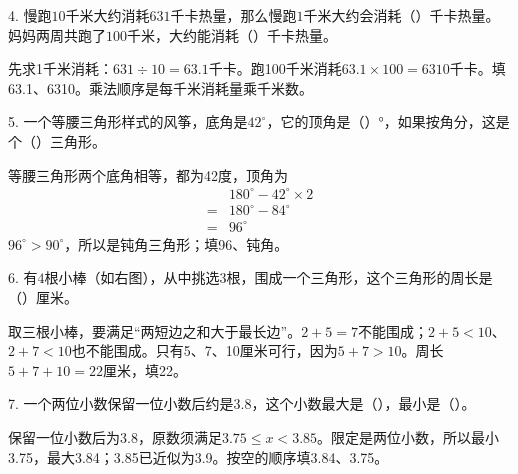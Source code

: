 4. 慢跑\(10\)千米大约消耗\(631\)千卡热量，那么慢跑\(1\)千米大约会消耗（\hspace{1.8em}）千卡热量。妈妈两周共跑了\(100\)千米，大约能消耗（\hspace{1.8em}）千卡热量。\par
\begin{BookAnswer}
先求1千米消耗：\(631\div10=63.1\)千卡。跑100千米消耗\(63.1\times100=6310\)千卡。填63.1、6310。乘法顺序是每千米消耗量乘千米数。
\end{BookAnswer}

5. 一个等腰三角形样式的风筝，底角是\(42^\circ\)，它的顶角是（\hspace{1.8em}）°，如果按角分，这是个（\hspace{1.8em}）三角形。\par
\begin{BookAnswer}
等腰三角形两个底角相等，都为42度，顶角为\[\begin{aligned} &180^\circ-42^\circ\times2\\ ={}&180^\circ-84^\circ\\ ={}&96^\circ\end{aligned}\]\(96^\circ>90^\circ\)，所以是钝角三角形；填96、钝角。
\end{BookAnswer}

6. 有\(4\)根小棒（如右图），从中挑选\(3\)根，围成一个三角形，这个三角形的周长是（\hspace{1.8em}）厘米。\par
{}
\begin{BookAnswer}
取三根小棒，要满足“两短边之和大于最长边”。\(2+5=7\)不能围成；\allowbreak{}\(2+5<10\)、\(2+7<10\)也不能围成。只有5、7、10厘米可行，因为\(5+7>10\)。周长\(5+7+10=22\)厘米，填22。
\end{BookAnswer}

7. 一个两位小数保留一位小数后约是\(3.8\)，这个小数最大是（\hspace{1.8em}），最小是（\hspace{1.8em}）。\par
\begin{BookAnswer}
保留一位小数后为3.8，原数须满足\(3.75\le x<3.85\)。限定是两位小数，所以最小3.75，最大3.84；3.85已近似为3.9。按空的顺序填3.84、3.75。
\end{BookAnswer}

